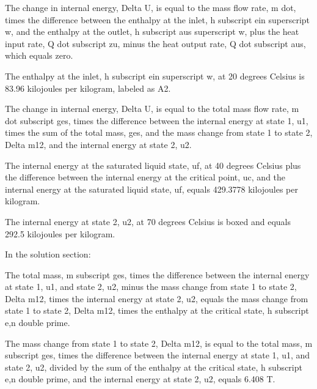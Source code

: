 The change in internal energy, Delta U, is equal to the mass flow rate, m dot, times the difference between the enthalpy at the inlet, h subscript ein superscript w, and the enthalpy at the outlet, h subscript aus superscript w, plus the heat input rate, Q dot subscript zu, minus the heat output rate, Q dot subscript aus, which equals zero.

The enthalpy at the inlet, h subscript ein superscript w, at 20 degrees Celsius is 83.96 kilojoules per kilogram, labeled as A2.

The change in internal energy, Delta U, is equal to the total mass flow rate, m dot subscript ges, times the difference between the internal energy at state 1, u1, times the sum of the total mass, ges, and the mass change from state 1 to state 2, Delta m12, and the internal energy at state 2, u2.

The internal energy at the saturated liquid state, uf, at 40 degrees Celsius plus the difference between the internal energy at the critical point, uc, and the internal energy at the saturated liquid state, uf, equals 429.3778 kilojoules per kilogram.

The internal energy at state 2, u2, at 70 degrees Celsius is boxed and equals 292.5 kilojoules per kilogram.

In the solution section:

The total mass, m subscript ges, times the difference between the internal energy at state 1, u1, and state 2, u2, minus the mass change from state 1 to state 2, Delta m12, times the internal energy at state 2, u2, equals the mass change from state 1 to state 2, Delta m12, times the enthalpy at the critical state, h subscript e,n double prime.

The mass change from state 1 to state 2, Delta m12, is equal to the total mass, m subscript ges, times the difference between the internal energy at state 1, u1, and state 2, u2, divided by the sum of the enthalpy at the critical state, h subscript e,n double prime, and the internal energy at state 2, u2, equals 6.408 T.